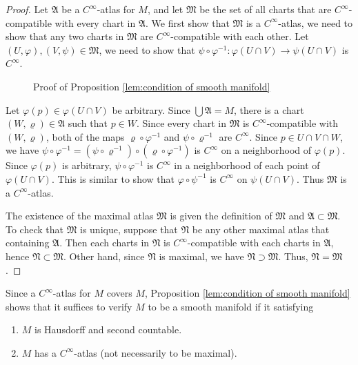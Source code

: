\begin{proof}
    Let $\mathfrak{A}$ be a $C^\infty$-atlas for $M$, and let $\mathfrak{M}$ be the set of all charts that are $C^\infty$-compatible with every chart in $\mathfrak{A}$. We first show that $\mathfrak{M}$ is a $C^\infty$-atlas, we need to show that any two charts in $\mathfrak{M}$ are $C^\infty$-compatible with each other. Let $(U, \varphi), (V, \psi) \in \mathfrak{M}$, we need to show that $\psi \circ \varphi^{-1} : \varphi(U \cap V) \to \psi(U \cap V)$ is $C^\infty$.

    \begin{figure}[h]
        \centering
        
        \caption{Proof of Proposition \ref{lem:condition of smooth manifold}}
    \end{figure}

    Let $\varphi(p) \in \varphi(U \cap V)$ be arbitrary. Since $\bigcup\mathfrak{A} = M$, there is a chart $(W, \varrho) \in \mathfrak{A}$ such that $p \in W$. Since every chart in $\mathfrak{M}$ is $C^\infty$-compatible with $(W, \varrho)$, both of the maps $\varrho \circ \varphi^{-1}$ and $\psi \circ \varrho^{-1}$ are $C^\infty$. Since $p \in U \cap V \cap W$, we have $\psi \circ \varphi^{-1} = (\psi \circ \varrho^{-1}) \circ (\varrho \circ \varphi^{-1})$ is $C^\infty$ on a neighborhood of $\varphi(p)$. Since $\varphi(p)$ is arbitrary, $\psi \circ \varphi^{-1}$ is $C^\infty$ in a neighborhood of each point of $\varphi(U \cap V)$. This is similar to show that $\varphi \circ \psi^{-1}$ is $C^\infty$ on $\psi(U \cap V)$. Thus $\mathfrak{M}$ is a $C^\infty$-atlas.

    The existence of the maximal atlas $\mathfrak{M}$ is given the definition of $\mathfrak{M}$ and $\mathfrak{A} \subset \mathfrak{M}$. To check that $\mathfrak{M}$ is unique, suppose that $\mathfrak{N}$ be any other maximal atlas that containing $\mathfrak{A}$. Then each charts in $\mathfrak{N}$ is $C^\infty$-compatible with each charts in $\mathfrak{A}$, hence $\mathfrak{N} \subset \mathfrak{M}$. Other hand, since $\mathfrak{N}$ is maximal, we have $\mathfrak{N} \supset \mathfrak{M}$. Thus, $\mathfrak{N} = \mathfrak{M}$.
\end{proof}

Since a $C^\infty$-atlas for $M$ covers $M$, Proposition \ref{lem:condition of smooth manifold} shows that it suffices to verify $M$ to be a smooth manifold if it satisfying
\begin{enumerate}
    \item $M$ is Hausdorff and second countable.
    \item $M$ has a $C^\infty$-atlas (not necessarily to be maximal).
\end{enumerate}

